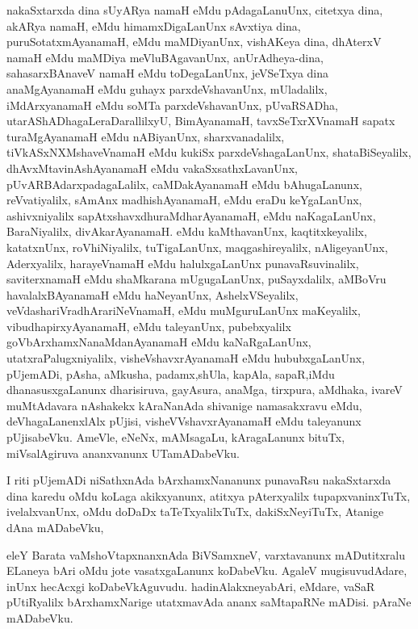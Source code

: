 \documentclass{article}
\begin{document}
\begin{mn}
nakaSxtarxda  dina  sUyARya  namaH  eMdu  pAdagaLanuUnx,  citetxya  dina,  akARya  namaH,  eMdu  
himamxDigaLanUnx  sAvxtiya  dina,  puruSotatxmAyanamaH,  eMdu  maMDiyanUnx,  vishAKeya  dina,  
dhAterxV  namaH  eMdu  maMDiya  meVluBAgavanUnx,  anUrAdheya-dina,  sahasarxBAnaveV  namaH  eMdu  
toDegaLanUnx, jeVSeTxya  dina  anaMgAyanamaH  eMdu  guhayx  parxdeVshavanUnx,  mUladalilx,  
iMdArxyanamaH  eMdu  soMTa  parxdeVshavanUnx,  pUvaRSADha,  utarAShADhagaLeraDarallilxyU,  
BimAyanamaH,  tavxSeTxrXVnamaH  sapatx  turaMgAyanamaH  eMdu  nABiyanUnx,  sharxvanadalilx,  
tiVkASxNXMshaveVnamaH eMdu kukiSx  parxdeVshagaLanUnx,  shataBiSeyalilx,  dhAvxMtavinAshAyanamaH  
eMdu  vakaSxsathxLavanUnx,  pUvARBAdarxpadagaLalilx,  caMDakAyanamaH  eMdu  bAhugaLanunx,  reVvatiyalilx,  
sAmAnx madhishAyanamaH,  eMdu  eraDu  keYgaLanUnx,  ashivxniyalilx  sapAtxshavxdhuraMdharAyanamaH,  eMdu  
naKagaLanUnx,  BaraNiyalilx,  divAkarAyanamaH.  eMdu  kaMthavanUnx,  kaqtitxkeyalilx,  katatxnUnx,  
roVhiNiyalilx,  tuTigaLanUnx,  maqgashireyalilx,  nAligeyanUnx,  Aderxyalilx,  harayeVnamaH  eMdu  
halulxgaLanUnx  punavaRsuvinalilx,  saviterxnamaH  eMdu  shaMkarana  mUgugaLanUnx,  puSayxdalilx,  aMBoVru 
havalalxBAyanamaH  eMdu  haNeyanUnx,  AshelxVSeyalilx,  veVdashariVradhArariNeVnamaH,  eMdu  muMguruLanUnx  
maKeyalilx,  vibudhapirxyAyanamaH,  eMdu  taleyanUnx,  pubebxyalilx  goVbArxhamxNanaMdanAyanamaH  eMdu  
kaNaRgaLanUnx,  utatxraPalugxniyalilx,  visheVshavxrAyanamaH  eMdu  hububxgaLanUnx,  pUjemADi,  pAsha,  
aMkusha,  padamx,shUla,  kapAla,  sapaR,iMdu  dhanasusxgaLanunx  dharisiruva,  gayAsura,  anaMga,  tirxpura,  
aMdhaka,  ivareV  muMtAdavara  nAshakekx  kAraNanAda  shivanige  namasakxravu  eMdu,  deVhagaLanenxlAlx  pUjisi,  
visheVVshavxrAyanamaH  eMdu  taleyanunx  pUjisabeVku.  AmeVle,  eNeNx,  mAMsagaLu,  kAragaLanunx  bituTx,  
miVsalAgiruva  ananxvanunx  UTamADabeVku.
\end{mn}

\begin{mn}
I  riti  pUjemADi  niSathxnAda  bArxhamxNananunx  punavaRsu  nakaSxtarxda  dina  karedu  oMdu  koLaga  
akikxyanunx,  atitxya pAterxyalilx  tupapxvaninxTuTx,  ivelalxvanUnx,  oMdu  doDaDx  taTeTxyalilxTuTx,  
dakiSxNeyiTuTx,  Atanige  dAna  mADabeVku,
\end{mn}

\begin{mn}
eleY  Barata  vaMshoVtapxnanxnAda  BiVSamxneV,  varxtavanunx  mADutitxralu  ELaneya  bAri  oMdu  jote  
vasatxgaLanunx  koDabeVku.  AgaleV  mugisuvudAdare,  inUnx  hecAcxgi  koDabeVkAguvudu.  hadinAlakxneyabAri,  
eMdare,  vaSaR  pUtiRyalilx  bArxhamxNarige  utatxmavAda  ananx  saMtapaRNe  mADisi.  pAraNe  mADabeVku.  
\end{mn}
\end{document}
